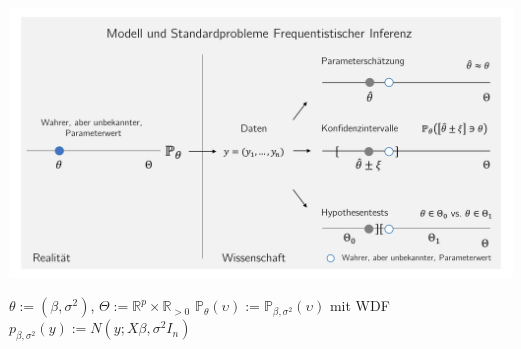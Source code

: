 \documentclass[
  8pt,
  ignorenonframetext,
]{beamer}
\begin{document}
\begin{frame}{}
\protect\hypertarget{section-5}{}
\center

\begin{center}\includegraphics[width=1\linewidth]{8_Abbildungen/alm_8_frequentistische_inferenz} \end{center}
\center
\footnotesize

\(\theta := (\beta,\sigma^2)\),
\(\Theta := \mathbb{R}^p \times \mathbb{R}_{>0}\)
\(\mathbb{P}_\theta(\upsilon) := \mathbb{P}_{\beta,\sigma^2}(\upsilon)\)
mit WDF \(p_{\beta,\sigma^2}(y) := N(y;X\beta,\sigma^2I_n)\)
\end{frame}
\end{document}
